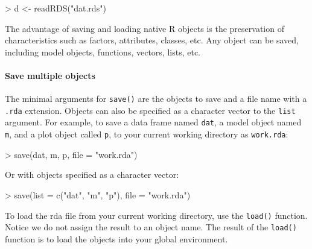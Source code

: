 \documentclass[
]{book}
\newenvironment{Shaded}{\begin{snugshade}}{\end{snugshade}}
\newcommand{\AttributeTok}[1]{\textcolor[rgb]{0.77,0.63,0.00}{#1}}
\newcommand{\FunctionTok}[1]{\textcolor[rgb]{0.00,0.00,0.00}{#1}}
\newcommand{\NormalTok}[1]{#1}
\newcommand{\OtherTok}[1]{\textcolor[rgb]{0.56,0.35,0.01}{#1}}
\newcommand{\SpecialCharTok}[1]{\textcolor[rgb]{0.00,0.00,0.00}{#1}}
\newcommand{\StringTok}[1]{\textcolor[rgb]{0.31,0.60,0.02}{#1}}
\begin{document}
\begin{Shaded}
\begin{Highlighting}[]
\SpecialCharTok{\textgreater{}}\NormalTok{ d }\OtherTok{\textless{}{-}} \FunctionTok{readRDS}\NormalTok{(}\StringTok{"dat.rds"}\NormalTok{)}
\end{Highlighting}
\end{Shaded}

The advantage of saving and loading native R objects is the preservation of characteristics such as factors, attributes, classes, etc. Any object can be saved, including model objects, functions, vectors, lists, etc.

\hypertarget{save-multiple-objects}{%
\paragraph*{Save multiple objects}\label{save-multiple-objects}}

The minimal arguments for \texttt{save()} are the objects to save and a file name with a \texttt{.rda} extension. Objects can also be specified as a character vector to the \texttt{list} argument. For example, to save a data frame named \texttt{dat}, a model object named \texttt{m}, and a plot object called \texttt{p}, to your current working directory as \texttt{work.rda}:

\begin{Shaded}
\begin{Highlighting}[]
\SpecialCharTok{\textgreater{}} \FunctionTok{save}\NormalTok{(dat, m, p, }\AttributeTok{file =} \StringTok{"work.rda"}\NormalTok{)}
\end{Highlighting}
\end{Shaded}

Or with objects specified as a character vector:

\begin{Shaded}
\begin{Highlighting}[]
\SpecialCharTok{\textgreater{}} \FunctionTok{save}\NormalTok{(}\AttributeTok{list =} \FunctionTok{c}\NormalTok{(}\StringTok{"dat"}\NormalTok{, }\StringTok{"m"}\NormalTok{, }\StringTok{"p"}\NormalTok{), }\AttributeTok{file =} \StringTok{"work.rda"}\NormalTok{)}
\end{Highlighting}
\end{Shaded}

To load the rda file from your current working directory, use the \texttt{load()} function. Notice we do not assign the result to an object name. The result of the \texttt{load()} function is to load the objects into your global environment.
\end{document}
